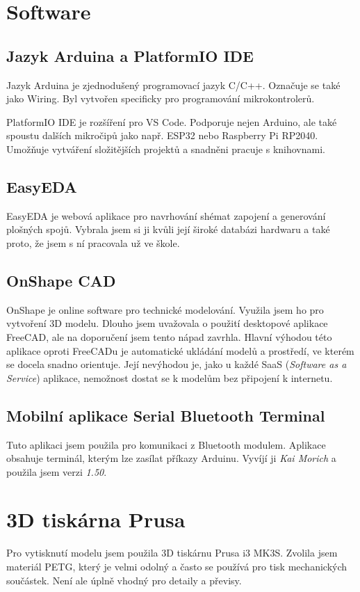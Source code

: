 \documentclass[12pt, a4paper,
twoside,        %
openright
]{report}
\begin{document}
	
	
	\section[Software]{Software}
	
	\subsection{Jazyk Arduina a PlatformIO IDE}
	Jazyk Arduina je zjednodušený programovací jazyk C/C++. Označuje se také jako Wiring. Byl vytvořen specificky pro programování mikrokontrolerů.  
	
	PlatformIO IDE je rozšíření pro VS Code. Podporuje nejen Arduino, ale také spoustu dalších mikročipů jako např. ESP32 nebo Raspberry Pi RP2040. Umožňuje vytváření složitějších projektů a snadněni pracuje s knihovnami. 
	
	\subsection{EasyEDA}
	EasyEDA je webová aplikace pro navrhování shémat zapojení a generování plošných spojů. Vybrala jsem si ji kvůli její široké databázi hardwaru a také proto, že jsem s ní pracovala už ve škole. 
	
	\subsection{OnShape CAD}
	OnShape je online software pro technické modelování. Využila jsem ho pro vytvoření 3D modelu. Dlouho jsem uvažovala o použití desktopové aplikace FreeCAD, ale na doporučení jsem tento nápad zavrhla. Hlavní výhodou této aplikace oproti FreeCADu je automatické ukládání modelů a prostředí, ve kterém se docela snadno orientuje. Její nevýhodou je, jako u každé SaaS (\textit{Software as a Service}) aplikace, nemožnost dostat se k modelům bez připojení k internetu.
	
	\subsection{Mobilní aplikace Serial Bluetooth Terminal}
	Tuto aplikaci jsem použila pro komunikaci z Bluetooth modulem. Aplikace obsahuje terminál, kterým lze zasílat příkazy Arduinu. Vyvíjí ji \textit{Kai Morich} a použila jsem verzi \textit{1.50}.
	
	\pagebreak
	\section{3D tiskárna Prusa}
	Pro vytisknutí modelu jsem použila 3D tiskárnu Prusa i3 MK3S. Zvolila jsem materiál PETG, který je velmi odolný a často se používá pro tisk mechanických součástek. Není ale úplně vhodný pro detaily a převisy.
\end{document}
